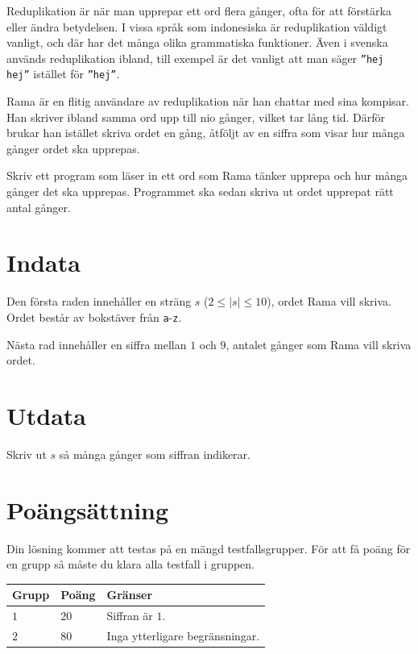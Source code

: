 \noindent

Reduplikation är när man upprepar ett ord flera gånger, ofta för att förstärka eller ändra betydelsen.
I vissa språk som indonesiska är reduplikation väldigt vanligt, och där har det många olika
grammatiska funktioner. Även i svenska används reduplikation ibland, till exempel är det vanligt
att man säger \texttt{''hej hej''} istället för \texttt{''hej''}.

Rama är en flitig användare av reduplikation när han chattar med sina kompisar. Han skriver ibland samma ord
upp till nio gånger, vilket tar lång tid. Därför brukar han istället skriva ordet en gång, åtföljt av en
siffra som visar hur många gånger ordet ska upprepas.

Skriv ett program som läser in ett ord som Rama tänker upprepa
och hur många gånger det ska upprepas. 
Programmet ska sedan skriva ut ordet upprepat rätt antal gånger.

\section*{Indata}
Den första raden innehåller en sträng $s$ ($2 \leq |s| \leq 10$), ordet Rama vill skriva.
Ordet består av bokstäver från \texttt{a}-\texttt{z}.

Nästa rad innehåller en siffra mellan $1$ och $9$, antalet gånger som Rama vill skriva ordet.

\section*{Utdata}
Skriv ut $s$ så många gånger som siffran indikerar. 


\section*{Poängsättning}
Din lösning kommer att testas på en mängd testfallsgrupper.
För att få poäng för en grupp så måste du klara alla testfall i gruppen.

\noindent
\begin{tabular}{| l | l | p{12cm} |}
  \hline
  \textbf{Grupp} & \textbf{Poäng} & \textbf{Gränser} \\ \hline
  $1$    & $20$       & Siffran är $1$. \\ \hline
  $2$    & $80$       & Inga ytterligare begränsningar. \\ \hline
\end{tabular}
